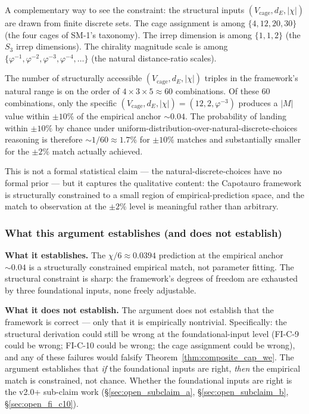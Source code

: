 \documentclass[11pt,letterpaper]{article}
\newcommand{\phig}{\varphi}
\newcommand{\Sthree}{S_3}
\begin{document}
A complementary way to see the constraint: the structural inputs $(V_\text{cage}, d_E, |\chi|)$ are drawn from finite discrete sets. The cage assignment is among $\{4, 12, 20, 30\}$ (the four cages of SM-1's taxonomy). The irrep dimension is among $\{1, 1, 2\}$ (the $\Sthree$ irrep dimensions). The chirality magnitude scale is among $\{\phig^{-1}, \phig^{-2}, \phig^{-3}, \phig^{-4}, \ldots\}$ (the natural distance-ratio scales).

The number of structurally accessible $(V_\text{cage}, d_E, |\chi|)$ triples in the framework's natural range is on the order of $4 \times 3 \times 5 \approx 60$ combinations. Of these 60 combinations, only the specific $(V_\text{cage}, d_E, |\chi|) = (12, 2, \phig^{-3})$ produces a $|M|$ value within $\pm 10\%$ of the empirical anchor $\sim 0.04$. The probability of landing within $\pm 10\%$ by chance under uniform-distribution-over-natural-discrete-choices reasoning is therefore $\sim 1/60 \approx 1.7\%$ for $\pm 10\%$ matches and substantially smaller for the $\pm 2\%$ match actually achieved.

This is not a formal statistical claim --- the natural-discrete-choices have no formal prior --- but it captures the qualitative content: the Capotauro framework is structurally constrained to a small region of empirical-prediction space, and the match to observation at the $\pm 2\%$ level is meaningful rather than arbitrary.

\subsubsection{What this argument establishes (and does not establish)}\label{sec:nontriviality_caveats}

\textbf{What it establishes.} The $\chi/6 \approx 0.0394$ prediction at the empirical anchor $\sim 0.04$ is a structurally constrained empirical match, not parameter fitting. The structural constraint is sharp: the framework's degrees of freedom are exhausted by three foundational inputs, none freely adjustable.

\textbf{What it does not establish.} The argument does not establish that the framework is correct --- only that it is empirically nontrivial. Specifically: the structural derivation could still be wrong at the foundational-input level (FI-C-9 could be wrong; FI-C-10 could be wrong; the cage assignment could be wrong), and any of these failures would falsify Theorem~\ref{thm:composite_cap_we}. The argument establishes that \emph{if} the foundational inputs are right, \emph{then} the empirical match is constrained, not chance. Whether the foundational inputs are right is the v2.0+ sub-claim work (\S\ref{sec:open_subclaim_a}, \S\ref{sec:open_subclaim_b}, \S\ref{sec:open_fi_c10}).
\end{document}
